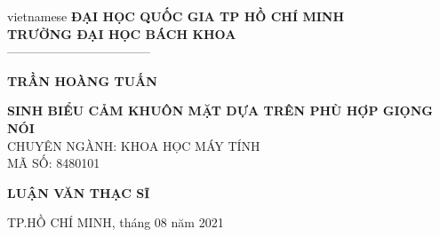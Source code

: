 \begin{titlepage}
\begin{center}

\vspace*{3\bigskipamount}

\begin{otherlanguage*}{vietnamese}
\makeatletter
\fontsize{12}{12}\textbf{ĐẠI HỌC QUỐC GIA TP HỒ CHÍ MINH}\\
\fontsize{14}{14}\textbf{TRƯỜNG ĐẠI HỌC BÁCH KHOA}\\
\fontsize{14}{14} -----------------------------------
\makeatother
\vspace{3cm}

{\makeatletter
\fontsize{16}{16}\textbf{TRẦN HOÀNG TUẤN}\\
\makeatother}
\vspace{3cm}

{\makeatletter
\fontsize{16}{16}\textbf{SINH BIỂU CẢM KHUÔN MẶT DỰA TRÊN PHÙ HỢP GIỌNG NÓI}\\
\vspace{1cm}
\fontsize{12}{12} CHUYÊN NGÀNH: KHOA HỌC MÁY TÍNH\\
\fontsize{12}{12} MÃ SỐ: 8480101\\
\makeatother}

\vspace{1.2cm}
{\makeatletter
\fontsize{18}{18}\textbf{LUẬN VĂN THẠC SĨ}\\
\makeatother}


\vspace{8cm}
{\makeatletter
\fontsize{12}{12} TP.HỒ CHÍ MINH, tháng 08 năm 2021\\
\makeatother}

\end{otherlanguage*}

\end{center}
\end{titlepage}
